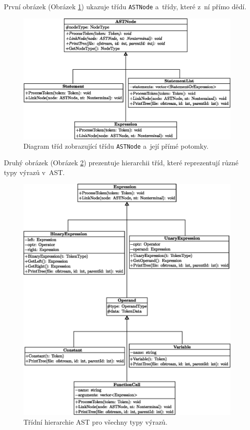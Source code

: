 První obrázek (Obrázek \ref{fig_hierarchie_astnode}) ukazuje třídu \texttt{ASTNode} a~třídy, které z~ní přímo dědí.
\begin{figure}[h]
	\centering
	\includegraphics[width=\textwidth]{obrazky-figures/ast_node_hierarchy.eps}
	\caption{Diagram tříd zobrazující třídu \texttt{ASTNode} a~její přímé potomky.}
	\label{fig_hierarchie_astnode}
\end{figure}
\newpage

Druhý obrázek (Obrázek \ref{fig_hierarchie_expression}) prezentuje hierarchii tříd, které reprezentují různé typy výrazů v~AST. 
\begin{figure}[h]
	\centering
	\includegraphics[width=\textwidth]{obrazky-figures/expression_hierarchy.eps}
	\caption{Třídní hierarchie AST pro všechny typy výrazů.}
	\label{fig_hierarchie_expression}
\end{figure}
\newpage

